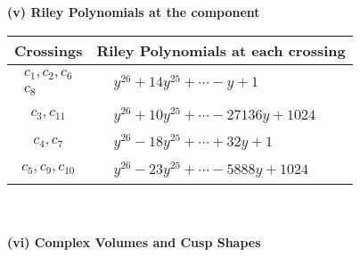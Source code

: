 \documentclass[1p]{elsarticle_modified}
\theoremstyle{definition}
\begin{document}
\newpage\renewcommand{\arraystretch}{1}
\flushleft \textbf{(v) Riley Polynomials at the component}\newline \\
\begin{tabular}{m{50pt}|m{274pt}}
Crossings & \hspace{64pt}Riley Polynomials at each crossing \\
\hline $$\begin{aligned}c_{1},c_{2},c_{6}\\c_{8}\end{aligned}$$&$\begin{aligned}
&y^{26}+14 y^{25}+\cdots- y+1
\end{aligned}$\\
\hline $$\begin{aligned}c_{3},c_{11}\end{aligned}$$&$\begin{aligned}
&y^{26}+10 y^{25}+\cdots-27136 y+1024
\end{aligned}$\\
\hline $$\begin{aligned}c_{4},c_{7}\end{aligned}$$&$\begin{aligned}
&y^{26}-18 y^{25}+\cdots+32 y+1
\end{aligned}$\\
\hline $$\begin{aligned}c_{5},c_{9},c_{10}\end{aligned}$$&$\begin{aligned}
&y^{26}-23 y^{25}+\cdots-5888 y+1024
\end{aligned}$\\
\hline
\end{tabular}\\~\\
\newpage\flushleft \textbf{(vi) Complex Volumes and Cusp Shapes}
\end{document}
